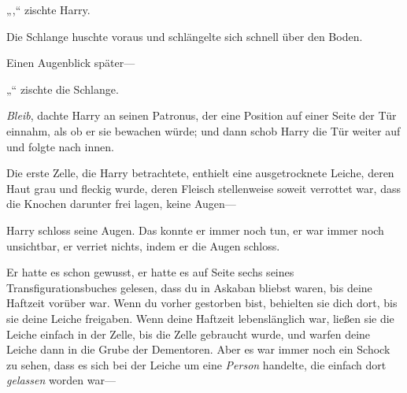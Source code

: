 „,“ zischte Harry.

Die Schlange huschte voraus und schlängelte sich schnell über den Boden.

Einen Augenblick später—

„“ zischte die Schlange.

\emph{Bleib}, dachte Harry an seinen Patronus, der eine Position auf einer Seite der Tür einnahm, als ob er sie bewachen würde; und dann schob Harry die Tür weiter auf und folgte nach innen.

Die erste Zelle, die Harry betrachtete, enthielt eine ausgetrocknete Leiche, deren Haut grau und fleckig wurde, deren Fleisch stellenweise soweit verrottet war, dass die Knochen darunter frei lagen, keine Augen—

Harry schloss seine Augen. Das konnte er immer noch tun, er war immer noch unsichtbar, er verriet nichts, indem er die Augen schloss.

Er hatte es schon gewusst, er hatte es auf Seite sechs seines Transfigurationsbuches gelesen, dass du in Askaban bliebst waren, bis deine Haftzeit vorüber war. Wenn du vorher gestorben bist, behielten sie dich dort, bis sie deine Leiche freigaben. Wenn deine Haftzeit lebenslänglich war, ließen sie die Leiche einfach in der Zelle, bis die Zelle gebraucht wurde, und warfen deine Leiche dann in die Grube der Dementoren. Aber es war immer noch ein Schock zu sehen, dass es sich bei der Leiche um eine \emph{Person} handelte, die einfach dort \emph{gelassen} worden war—

